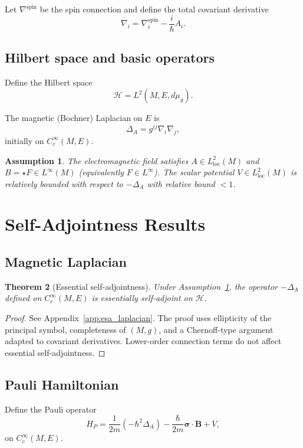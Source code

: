 \documentclass[11pt]{article}
\newtheorem{theorem}{Theorem}[section]
\newtheorem{assumption}[theorem]{Assumption}
\begin{document}
Let $\nabla^{\mathrm{spin}}$ be the spin connection and define the total covariant derivative
\[
\nabla_i = \nabla^{\mathrm{spin}}_i - \frac{i}{\hbar}A_i.
\]

\subsection{Hilbert space and basic operators}

Define the Hilbert space
\[
\mathcal{H} = L^2(M,E,d\mu_g).
\]

The magnetic (Bochner) Laplacian on $E$ is
\[
\Delta_A = g^{ij}\nabla_i\nabla_j,
\]
initially on $C_c^\infty(M,E)$.

\begin{assumption}\label{ass:coeff}
The electromagnetic field satisfies $A\in L^2_{\mathrm{loc}}(M)$ and $B=\star F\in L^\infty(M)$ (equivalently $F\in L^\infty$). The scalar potential $V\in L^2_{\mathrm{loc}}(M)$ is relatively bounded with respect to $-\Delta_A$ with relative bound $<1$.
\end{assumption}

\section{Self-Adjointness Results}

\subsection{Magnetic Laplacian}

\begin{theorem}[Essential self-adjointness]\label{thm:esa_DeltaA}
Under Assumption~\ref{ass:coeff}, the operator $-\Delta_A$ defined on $C_c^\infty(M,E)$ is essentially self-adjoint on $\mathcal{H}$.
\end{theorem}

\begin{proof}
See Appendix~\ref{app:esa_laplacian}. The proof uses ellipticity of the principal symbol, completeness of $(M,g)$, and a Chernoff-type argument adapted to covariant derivatives. Lower-order connection terms do not affect essential self-adjointness.
\end{proof}

\subsection{Pauli Hamiltonian}

Define the Pauli operator
\[
H_P = \frac{1}{2m}(-\hbar^2 \Delta_A) - \frac{\hbar}{2m}\bm{\sigma}\cdot \bm{B} + V,
\]
on $C_c^\infty(M,E)$.
\end{document}
